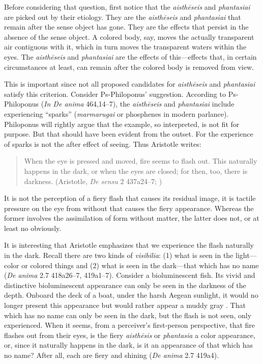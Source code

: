 Before considering that question, first notice that the \emph{aisthēseis} and \emph{phantasiai} are picked out by their etiology. They are the \emph{aisthēseis} and \emph{phantasiai} that remain after the sense object has gone. They are the effects that persist in the absence of the sense object. A colored body, say, moves the actually transparent air contiguous with it, which in turn moves the transparent waters within the eyes. The \emph{aisthēseis} and \emph{phantasiai} are the effects of this—effects that, in certain circumstances at least, can remain after the colored body is removed from view.

This is important since not all proposed candidates for \emph{aisthēseis} and \emph{phantasiai} satisfy this criterion. Consider Ps-Philoponus' suggestion. According to Ps-Phi\-lo\-po\-nus (\emph{In De anima} 464,14–7), the \emph{aisthēseis} and \emph{phantasiai} include experiencing ``sparks'' (\emph{marmarugai} or phosphenes in modern parlance). Philoponus will rightly argue that the example, so interpreted, is not fit for purpose. But that should have been evident from the outset. For the experience of sparks is not the after effect of seeing. Thus Aristotle writes:
\begin{quote}
	When the eye is pressed and moved, fire seems to flash out. This naturally happens in the dark, or when the eyes are closed; for then, too, there is darkness. (Aristotle, \emph{De sensu} 2 437a24–7; \citealt[219–20]{Hett:1936fk})
\end{quote}
It is not the perception of a fiery flash that causes its residual image, it is tactile pressure on the eye from without that causes the fiery appearance. Whereas the former involves the assimilation of form without matter, the latter does not, or at least no obviously.

It is interesting that Aristotle emphasizes that we experience the flash naturally in the dark. Recall there are two kinds of \emph{visibilia}: (1) what is seen in the light—color or colored things and (2) what is seen in the dark—that which has no name (\emph{De anima} 2.7 418a26–7, 419a1–7). Consider a bioluminescent fish. Its vivid and distinctive bioluminescent appearance can only be seen in the darkness of the depth. Onboard the deck of a boat, under the harsh Aegean sunlight, it would no longer present this appearance but would rather appear a muddy gray \citep[65–6]{Austin:1962lr}. That which has no name can only be seen in the dark, but the flash is not seen, only experienced. When it seems, from a perceiver's first-person perspective, that fire flashes out from their eyes, is the fiery \emph{aisthēsis} or \emph{phantasia} a color appearance, or, since it naturally happens in the dark, is it an appearance of that which has no name? After all, each are fiery and shining (\emph{De anima} 2.7 419a4).

